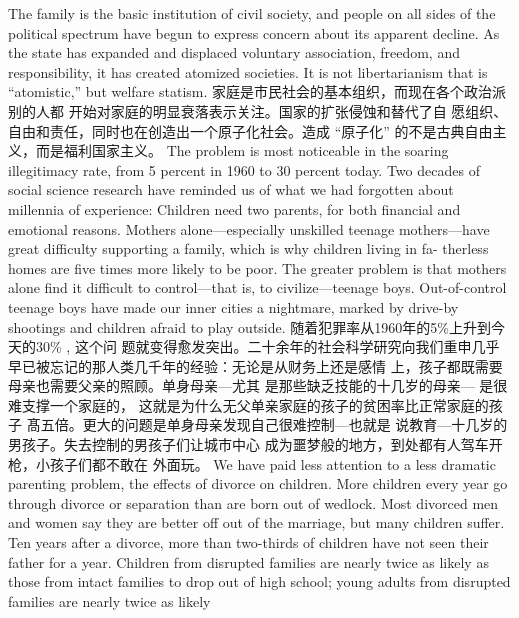 \begin{paracol}{2}
The family is the basic institution of civil society, and people on
all sides of the political spectrum have begun to express concern
about its apparent decline. As the state has expanded and displaced voluntary association, freedom, and responsibility, it has
created atomized societies. It is not libertarianism that is
``atomistic,'' but welfare statism.
\switchcolumn
家庭是市民社会的基本组织，而现在各个政治派别的人都
开始对家庭的明显衰落表示关注。国家的扩张侵蚀和替代了自
愿组织、自由和责任，同时也在创造出一个原子化社会。造成
“原子化” 的不是古典自由主义，而是福利国家主义。
\switchcolumn*
The problem is most noticeable in the soaring illegitimacy
rate, from 5 percent in 1960 to 30 percent today. Two decades
of social science research have reminded us of what we had forgotten about millennia of experience: Children need two parents, for both financial and emotional reasons. Mothers alone---especially unskilled teenage mothers---have great difficulty supporting a family, which is why children living in fa-
therless homes are five times more likely to be poor. The greater
problem is that mothers alone find it difficult to control---that
is, to civilize---teenage boys. Out-of-control teenage boys have
made our inner cities a nightmare, marked by drive-by shootings and children afraid to play outside.
\switchcolumn
随着犯罪率从1960年的5\%上升到今天的30\% , 这个问
题就变得愈发突出。二十余年的社会科学研究向我们重申几乎
早已被忘记的那人类几千年的经验：无论是从财务上还是感情
上，孩子都既需要母亲也需要父亲的照顾。单身母亲---尤其
是那些缺乏技能的十几岁的母亲--- 是很难支撑一个家庭的，
这就是为什么无父单亲家庭的孩子的贫困率比正常家庭的孩子
髙五倍。更大的问题是单身母亲发现自己很难控制---也就是
说教育---十几岁的男孩子。失去控制的男孩子们让城市中心
成为噩梦般的地方，到处都有人驾车开枪，小孩子们都不敢在
外面玩。
\switchcolumn*
We have paid less attention to a less dramatic parenting
problem, the effects of divorce on children. More children every
year go through divorce or separation than are born out of wedlock. Most divorced men and women say they are better off out
of the marriage, but many children suffer. Ten years after a divorce, more than two-thirds of children have not seen their father for a year. Children from disrupted families are nearly twice
as likely as those from intact families to drop out of high school;
young adults from disrupted families are nearly twice as likely

\end{paracol}
